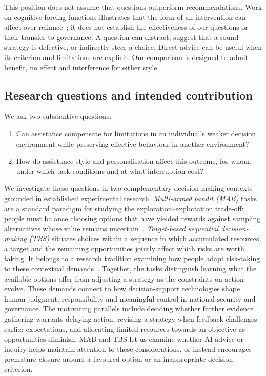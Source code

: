 \documentclass[11pt,a4paper]{article}
\begin{document}
This position does not assume that questions outperform recommendations. Work on cognitive forcing functions illustrates that the form of an intervention can affect over-reliance~\cite{bucinca}; it does not establish the effectiveness of our questions or their transfer to governance. A question can distract, suggest that a sound strategy is defective, or indirectly steer a choice. Direct advice can be useful when its criterion and limitations are explicit. Our comparison is designed to admit benefit, no effect and interference for either style.

\subsection{Research questions and intended contribution}
We ask two substantive questions:
\begin{enumerate}
\item Can assistance compensate for limitations in an individual's weaker decision environment while preserving effective behaviour in another environment?
\item How do assistance style and personalisation affect this outcome, for whom, under which task conditions and at what interruption cost?
\end{enumerate}

We investigate these questions in two complementary decision-making contexts grounded in established experimental research. \emph{Multi-armed bandit (MAB)} tasks are a standard paradigm for studying the exploration--exploitation trade-off: people must balance choosing options that have yielded rewards against sampling alternatives whose value remains uncertain~\cite{daw}. \emph{Target-based sequential decision-making (TBS)} situates choices within a sequence in which accumulated resources, a target and the remaining opportunities jointly affect which risks are worth taking. It belongs to a research tradition examining how people adapt risk-taking to these contextual demands~\cite{kolling}. Together, the tasks distinguish learning what the available options offer from adjusting a strategy as the constraints on action evolve. These demands connect to how decision-support technologies shape human judgment, responsibility and meaningful control in national security and governance. The motivating parallels include deciding whether further evidence gathering warrants delaying action, revising a strategy when feedback challenges earlier expectations, and allocating limited resources towards an objective as opportunities diminish. MAB and TBS let us examine whether AI advice or inquiry helps maintain attention to these considerations, or instead encourages premature closure around a favoured option or an inappropriate decision criterion. 
\end{document}

